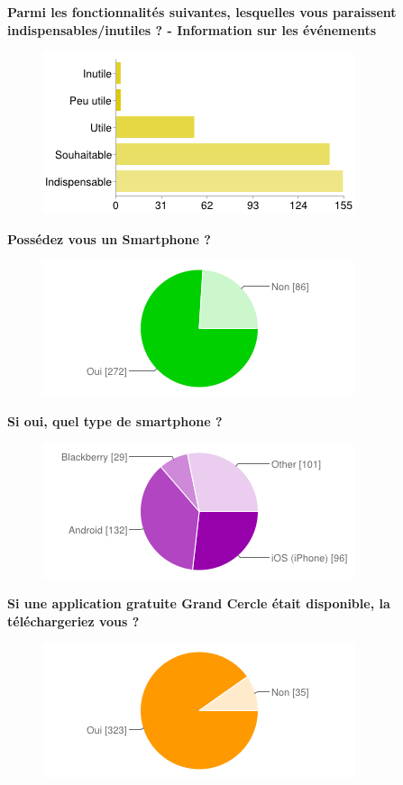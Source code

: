 \documentclass[a4paper, 11px]{article}
\begin{document}
\vspace{2cm}

\textbf{Parmi les fonctionnalités suivantes, lesquelles vous paraissent indispensables/inutiles ? - Information sur les événements}
\begin{figure}[h!]
\includegraphics[scale=1]{info_event.png}
\end{figure}

\vfill
\newpage

\vfill
\textbf{Possédez vous un Smartphone ?}
\begin{figure}[h!]
\includegraphics[scale=1]{smart.png}
\end{figure}

\vspace{1cm}

\textbf{Si oui, quel type de smartphone ?}
\begin{figure}[h!]
\includegraphics[scale=1]{quel_smart.png}
\end{figure}

\vspace{1cm}

\textbf{Si une application gratuite Grand Cercle était disponible, la téléchargeriez vous ?}
\begin{figure}[h!]
\includegraphics[scale=1]{telecharger.png}
\end{figure}

\vfill
\newpage


\label{stats}
\end{document}
